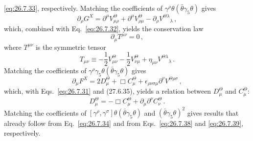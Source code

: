 \eqref{eq:26.7.33}, respectively. Matching the coefficients of
\(\gamma^\rho\theta(\bar\theta\gamma_5\theta)\) gives
\begin{equation}
  \partial_\rho G^X
  =\partial^\mu V_{\mu\rho}^\Theta
   +\partial^\mu V_{\rho\mu}^\Theta
   -\partial_\rho V^{\Theta\lambda}{}_\lambda\,,
  \tag{26.7.40}\label{eq:26.7.40}
\end{equation}
which, combined with Eq.~\eqref{eq:26.7.32}, yields the conservation law
\begin{equation}
  \partial_\mu T^{\mu\nu}=0\,,
  \tag{26.7.41}\label{eq:26.7.41}
\end{equation}
where \(T^{\mu\nu}\) is the symmetric tensor
\begin{equation}
  T_{\mu\nu}
  \equiv-\frac12V_{\mu\nu}^\Theta-\frac12V_{\nu\mu}^\Theta
         +\eta_{\mu\nu}V^{\Theta\lambda}{}_\lambda\,.
  \tag{26.7.42}\label{eq:26.7.42}
\end{equation}
Matching the coefficients of
\(\gamma^\rho\gamma_5\theta(\bar\theta\gamma_5\theta)\) gives
\begin{equation}
  \partial_\mu F^X
  =2D_\mu^\Theta+\Box C_\mu^\Theta
   +\epsilon_{\rho\nu\sigma\mu}\partial^\nu
    V^{\Theta\rho\sigma}\,,
  \tag{26.7.43}\label{eq:26.7.43}
\end{equation}
which, with Eqs.~\eqref{eq:26.7.31} and (27.6.35), yields a relation
between \(D_\mu^\Theta\) and \(C_\mu^\Theta\):
\begin{equation}
  D_\mu^\Theta
  =-\Box C_\mu^\Theta+\partial_\mu\partial^\nu C_\nu^\Theta\,.
  \tag{26.7.44}\label{eq:26.7.44}
\end{equation}
Matching the coefficients of
\([\gamma^\rho,\gamma^\sigma]\theta(\bar\theta\gamma_5\theta)\) and
\((\bar\theta\gamma_5\theta)^2\) gives results that already follow from
Eq.~\eqref{eq:26.7.34} and from Eqs.~\eqref{eq:26.7.38} and
\eqref{eq:26.7.39}, respectively.

